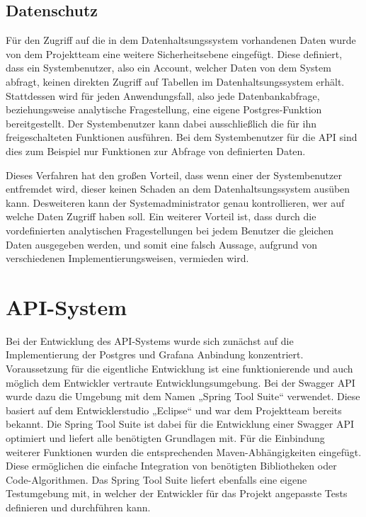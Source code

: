 {\subsection{Datenschutz}
\label{subsec:postgres_datenschutz}
Für den Zugriff auf die in dem Datenhaltsungssystem vorhandenen Daten wurde von
dem Projektteam eine weitere Sicherheitsebene eingefügt. Diese definiert, dass
ein Systembenutzer, also ein Account, welcher Daten von dem System abfragt,
keinen direkten Zugriff auf Tabellen im Datenhaltsungssystem erhält.
Stattdessen wird für jeden Anwendungsfall, also jede Datenbankabfrage,
beziehungsweise analytische Fragestellung, eine eigene Postgres\hyp{}Funktion
bereitgestellt. Der Systembenutzer kann dabei ausschließlich die für ihn
freigeschalteten Funktionen ausführen. Bei dem Systembenutzer für die API sind
dies zum Beispiel nur Funktionen zur Abfrage von definierten Daten.

Dieses Verfahren hat den großen Vorteil, dass wenn einer der Systembenutzer
entfremdet wird, dieser keinen Schaden an dem Datenhaltsungssystem ausüben
kann. Desweiteren kann der Systemadministrator genau kontrollieren, wer auf
welche Daten Zugriff haben soll. Ein weiterer Vorteil ist, dass durch die
vordefinierten analytischen Fragestellungen bei jedem Benutzer die gleichen
Daten ausgegeben werden, und somit eine falsch Aussage, aufgrund von
verschiedenen Implementierungsweisen, vermieden wird.
\nl%

\section{API-System}
\label{sec:api_system}
Bei der Entwicklung des API\hyp{}Systems wurde sich zunächst auf die
Implementierung der Postgres und Grafana Anbindung konzentriert. Voraussetzung
für die eigentliche Entwicklung ist eine funktionierende und auch möglich dem
Entwickler vertraute Entwicklungsumgebung. Bei der Swagger API wurde dazu die
Umgebung mit dem Namen „Spring Tool Suite“ verwendet. Diese basiert auf dem
Entwicklerstudio „Eclipse“ und war dem Projektteam bereits bekannt. Die Spring
Tool Suite ist dabei für die Entwicklung einer Swagger API optimiert und
liefert alle benötigten Grundlagen mit. Für die Einbindung weiterer Funktionen
wurden die entsprechenden Maven\hyp{}Abhängigkeiten eingefügt. Diese
ermöglichen die einfache Integration von benötigten Bibliotheken oder
Code\hyp{}Algorithmen. Das Spring Tool Suite liefert ebenfalls eine eigene
Testumgebung mit, in welcher der Entwickler für das Projekt angepasste Tests
definieren und durchführen kann.

}

